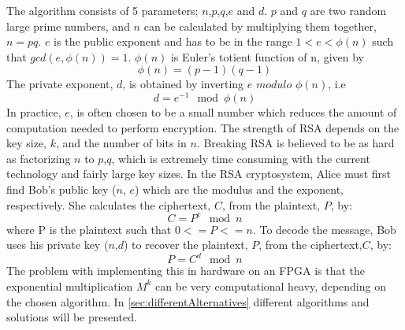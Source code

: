 The algorithm consists of 5 parameters; $n$,$p$,$q$,$e$ and $d$. 
$p$ and $q$ are two random large prime numbers, and $n$ can be calculated by multiplying 
them together, $n=pq$. $e$ is the public exponent and has to be in the range $1<e<\phi(n)$ 
such that $gcd(e,\phi(n))=1$. $\phi(n)$ is Euler's totient function of n, given by
%
\begin{equation}
    \phi(n)=(p-1)(q-1)
\end{equation}
%
The private exponent, $d$, is obtained by inverting $e$ $modulo$ $\phi(n)$, i.e
%
\begin{equation}
    d=e^{-1}\mod{\phi(n)}
\end{equation}
%
In practice, $e$, is often chosen to be a small number which reduces the amount of computation needed to perform encryption. The strength of RSA depends on the key size, $k$, and the number of bits in $n$. Breaking RSA is believed to be as hard as factorizing $n$ to $p$,$q$, which is extremely time consuming with the current technology and fairly large key sizes. 
%
In the RSA cryptosystem, Alice must first find Bob's public key ($n$, $e$) which are the modulus and the exponent, respectively. She calculates the ciphertext, $C$, from the plaintext, $P$, by: 
%
\begin{equation}
    C=P^e\mod{n}
\end{equation}
%
where P is the plaintext such that $0<=P<=n$. To decode the message, Bob uses his private key ($n$,$d$) to recover the plaintext, $P$, from the ciphertext,$C$, by:
%
\begin{equation}
    P=C^d\mod{n}
\end{equation}
%
The problem with implementing this in hardware on an FPGA is that the exponential multiplication
$M^k$ can be very computational heavy, depending on the chosen algorithm. In \cref{sec:differentAlternatives} different algorithms and solutions will be presented.
%
\newpage

